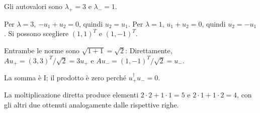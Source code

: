 \ExSolution


Gli autovalori sono \(\lambda_+=3\) e \(\lambda_-=1\).


Per \(\lambda=3\), \(-u_1+u_2=0\), quindi \(u_2=u_1\). Per \(\lambda=1\), \(u_1+u_2=0\), quindi \(u_2=-u_1\). Si possono scegliere \((1,1)^T\) e \((1,-1)^T\).


Entrambe le norme sono \(\sqrt{1+1}=\sqrt2\):
Direttamente, \(Au_+=(3,3)^T/\sqrt2=3u_+\) e \(Au_-=(1,-1)^T/\sqrt2=u_-\).


La somma è I; il prodotto è zero perché \(u_+^\dagger u_-=0\).




La moltiplicazione diretta produce elementi \(2\cdot2+1\cdot1=5\) e \(2\cdot1+1\cdot2=4\), con gli altri due ottenuti analogamente dalle rispettive righe.


